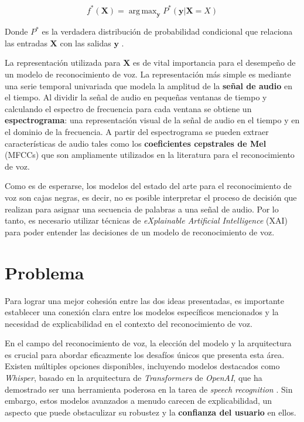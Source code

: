 \documentclass[conference]{IEEEtran}
\DeclareMathOperator*{\argmax}{arg\,max}
\begin{document}
\begin{equation}
    f^\ast(\mathbf{X}) = \argmax_{\mathbf{y}} P^\ast(\mathbf{y}| \mathbf{X} = X)
\end{equation}

Donde $P^\ast$ es la verdadera distribución de probabilidad condicional que relaciona las entradas $\mathbf{X}$ con las salidas $\mathbf{y}$ \cite{Goodfellow-et-al-2016}.

La representación utilizada para $\mathbf{X}$ es de vital importancia para el desempeño de un modelo de reconocimiento de voz. La representación más simple es mediante una serie temporal univariada que modela la amplitud de la \textbf{señal de audio} en el tiempo. Al dividir la señal de audio en pequeñas ventanas de tiempo y calculando el espectro de frecuencia para cada ventana se obtiene un \textbf{espectrograma}: una representación visual de la señal de audio en el tiempo y en el dominio de la frecuencia. A partir del espectrograma se pueden extraer características de audio tales como los \textbf{coeficientes cepstrales de Mel} (MFCCs) que son ampliamente utilizados en la literatura para el reconocimiento de voz.

Como es de esperarse, los modelos del estado del arte para el reconocimiento de voz son cajas negras, es decir, no es posible interpretar el proceso de decisión que realizan para asignar una secuencia de palabras a una señal de audio.  Por lo tanto, es necesario utilizar técnicas de \textit{eXplainable Artificial Intelligence} (XAI) para poder entender las decisiones de un modelo de reconocimiento de voz.

\section{Problema}

Para lograr una mejor cohesión entre las dos ideas presentadas, es importante establecer una conexión clara entre los modelos específicos mencionados y la necesidad de explicabilidad en el contexto del reconocimiento de voz.

En el campo del reconocimiento de voz, la elección del modelo y la arquitectura es crucial para abordar eficazmente los desafíos únicos que presenta esta área. Existen múltiples opciones disponibles, incluyendo modelos destacados como \textit{Whisper}, basado en la arquitectura de \textit{Transformers} de \textit{OpenAI}, que ha demostrado ser una herramienta poderosa en la tarea de \textit{speech recognition} \cite{radford2022robust}. Sin embargo, estos modelos avanzados a menudo carecen de explicabilidad, un aspecto que puede obstaculizar su robustez y la \textbf{confianza del usuario} en ellos.
\end{document}
